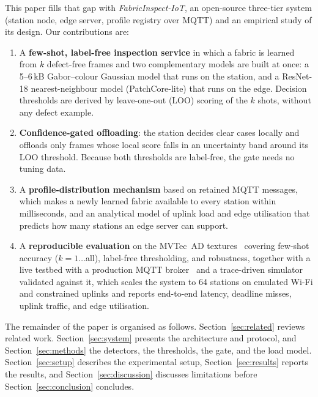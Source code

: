 This paper fills that gap with \emph{FabricInspect-IoT}, an open-source three-tier system (station node, edge server, profile registry over MQTT) and an empirical study of its design. Our contributions are:
\begin{enumerate}
\item A \textbf{few-shot, label-free inspection service} in which a fabric is learned from $k$ defect-free frames and two complementary models are built at once: a 5--6\,kB Gabor--colour Gaussian model that runs on the station, and a ResNet-18 nearest-neighbour model (PatchCore-lite) that runs on the edge. Decision thresholds are derived by leave-one-out (LOO) scoring of the $k$ shots, without any defect example.
\item \textbf{Confidence-gated offloading}: the station decides clear cases locally and offloads only frames whose local score falls in an uncertainty band around its LOO threshold. Because both thresholds are label-free, the gate needs no tuning data.
\item A \textbf{profile-distribution mechanism} based on retained MQTT messages, which makes a newly learned fabric available to every station within milliseconds, and an analytical model of uplink load and edge utilisation that predicts how many stations an edge server can support.
\item A \textbf{reproducible evaluation} on the MVTec~AD textures~\cite{bergmann2019mvtec,bergmann2021mvtec} covering few-shot accuracy ($k=1\ldots$all), label-free thresholding, and robustness, together with a live testbed with a production MQTT broker~\cite{light2017mosquitto} and a trace-driven simulator validated against it, which scales the system to 64 stations on emulated Wi-Fi and constrained uplinks and reports end-to-end latency, deadline misses, uplink traffic, and edge utilisation.
\end{enumerate}

The remainder of the paper is organised as follows. Section~\ref{sec:related} reviews related work. Section~\ref{sec:system} presents the architecture and protocol, and Section~\ref{sec:methods} the detectors, the thresholds, the gate, and the load model. Section~\ref{sec:setup} describes the experimental setup, Section~\ref{sec:results} reports the results, and Section~\ref{sec:discussion} discusses limitations before Section~\ref{sec:conclusion} concludes.
